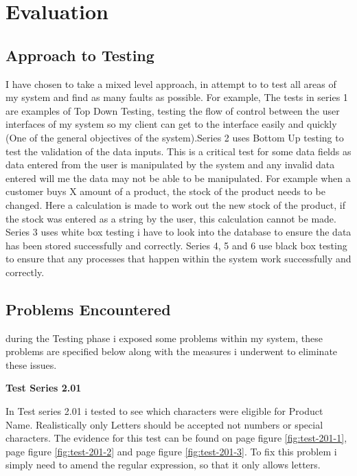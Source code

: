 \section{Evaluation}

\subsection{Approach to Testing}

I have chosen to take a mixed level approach, in attempt to to test all areas of my system and find as many faults as possible. For example,  The tests in series 1 are examples of Top Down Testing, testing the flow of control between the user interfaces of my system so my client can get to the interface easily and quickly (One of the general objectives of the system).Series 2 uses Bottom Up testing to test the validation of the data inputs. This is a critical test for some data fields as data entered from the user is manipulated by the system and any invalid data entered will me the data may not be able to be manipulated. For example when a customer buys X amount of a product, the stock of the product needs to be changed. Here a calculation is made to work out the new stock of the product, if the stock was entered as a string by the user, this calculation cannot be made. Series 3 uses white box testing i have to look into the database to ensure the data has been stored successfully and correctly. Series 4, 5 and 6 use black box testing to ensure that any processes that happen within the system work successfully and correctly.

\subsection{Problems Encountered}

during the Testing phase i exposed some problems within my system, these problems are specified below along with the measures i underwent to eliminate these issues. 

\textbf{Test Series 2.01}
\label{fig:Test Series 2.01}

In Test series 2.01 i tested to see which characters were eligible for Product Name. Realistically only Letters should be accepted not numbers or special characters. The evidence for this test can be found on page \pageref{fig:test-201-1} figure \ref{fig:test-201-1}, page \pageref{fig:test-201-2} figure \ref{fig:test-201-2} and  page \pageref{fig:test-201-3} figure \ref{fig:test-201-3}. To fix this problem i simply need to amend the regular expression, so that it only allows letters. 


